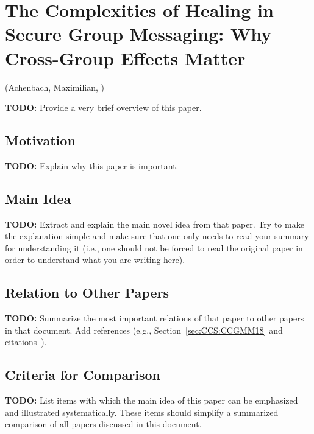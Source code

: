 \section{The Complexities of Healing in Secure Group Messaging: Why Cross-Group Effects Matter}
\label{sec:TCC:BieDodRos20}
(Achenbach, Maximilian, \cite{TCC:BieDodRos20,EPRINT:BieDodRos20})

\alert{\textbf{TODO:} Provide a very brief overview of this paper.}

\subsection{Motivation}
\alert{\textbf{TODO:} Explain why this paper is important.}

\subsection{Main Idea}
\alert{\textbf{TODO:} Extract and explain the main novel idea from that paper. Try to make the explanation simple and make sure that one only needs to read your summary for understanding it (i.e., one should not be forced to read the original paper in order to understand what you are writing here).}

\subsection{Relation to Other Papers}
\alert{\textbf{TODO:} Summarize the most important relations of that paper to other papers in that document. Add references (e.g., Section~\ref{sec:CCS:CCGMM18} and citations~\cite{CCS:CCGMM18}).}

\subsection{Criteria for Comparison}
\alert{\textbf{TODO:} List items with which the main idea of this paper can be emphasized and illustrated systematically. These items should simplify a summarized comparison of all papers discussed in this document.}
